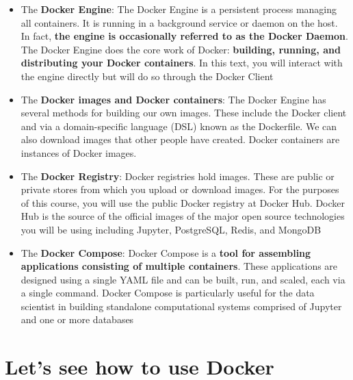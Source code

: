 \documentclass[handout]{beamer}[10pt, usepdftitle=false]
\begin{document}
	\begin{frame}
	
	\begin{itemize}
		\item{The \textbf{Docker Engine}: The Docker Engine is a persistent process managing all containers. It is running in a background service or daemon on the host. In fact, \textbf{the engine is occasionally referred to as the Docker Daemon}. The Docker Engine does the core work of Docker: \textbf{building, running, and distributing your Docker containers}. In this text, you will interact with the engine directly but will do so through the Docker Client}
		\item{The \textbf{Docker images and Docker containers}: The Docker Engine has several methods for building our own images. These include the Docker client and via a domain-specific language (DSL) known as the Dockerfile. We can also download images that other people have created. Docker containers are instances of Docker images.}	
	\end{itemize}		
		
	
	\end{frame}	
	
	\begin{frame}
	
	
	\begin{itemize}
		\item{The \textbf{Docker Registry}: Docker registries hold images. These are public or private stores from which you upload
or download images. For the purposes of this course, you will use the public Docker registry at Docker Hub. Docker Hub is the source of the official images of the major open source technologies you will be using including Jupyter, PostgreSQL, Redis, and MongoDB}
		\item{The \textbf{Docker Compose}: Docker Compose is a \textbf{tool for assembling applications consisting of multiple containers}. These applications are designed using a single YAML file and can be built, run, and scaled, each via a single command. Docker Compose is particularly useful for the data scientist in building standalone computational systems comprised of Jupyter and one or more databases}		
	\end{itemize}		
	
	\end{frame}		

	\section{Let's see how to use Docker}
	
\end{document}
